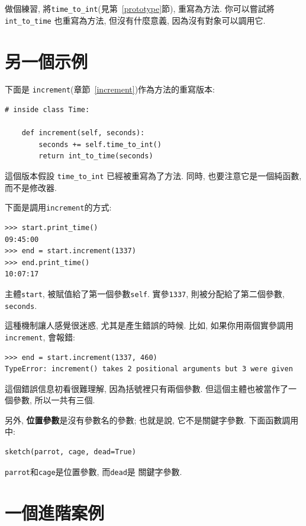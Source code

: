 \documentclass[10pt]{book}
\begin{document}
做個練習, 將\verb"time_to_int"(見第~\ref{prototype}節), 重寫為方法. 
你可以嘗試將\verb"int_to_time" 也重寫為方法, 但沒有什麼意義, 
因為沒有對象可以調用它. 


\section{另一個示例}

下面是 {\tt increment}(章節~\ref{increment})作為方法的重寫版本:

\begin{verbatim}
# inside class Time:

    def increment(self, seconds):
        seconds += self.time_to_int()
        return int_to_time(seconds)
\end{verbatim}
%
這個版本假設 \verb"time_to_int" 已經被重寫為了方法. 
同時, 也要注意它是一個純函數, 而不是修改器. 

下面是調用{\tt increment}的方式:

\begin{verbatim}
>>> start.print_time()
09:45:00
>>> end = start.increment(1337)
>>> end.print_time()
10:07:17
\end{verbatim}
%
主體{\tt start}, 被賦值給了第一個參數{\tt self}. 
實參{\tt 1337}, 則被分配給了第二個參數, {\tt seconds}. 

這種機制讓人感覺很迷惑, 尤其是產生錯誤的時候. 
比如, 如果你用兩個實參調用{\tt increment}, 會報錯:

\begin{verbatim}
>>> end = start.increment(1337, 460)
TypeError: increment() takes 2 positional arguments but 3 were given
\end{verbatim}
%
這個錯誤信息初看很難理解, 因為括號裡只有兩個參數. 
但這個主體也被當作了一個參數, 所以一共有三個. 

另外, {\bf 位置參數}是沒有參數名的參數;
也就是說, 它不是關鍵字參數. 
下面函數調用中:

\begin{verbatim}
sketch(parrot, cage, dead=True)
\end{verbatim}

{\tt parrot}和{\tt cage}是位置參數, 而{\tt dead}是
關鍵字參數.


\section{一個進階案例}
\end{document}

